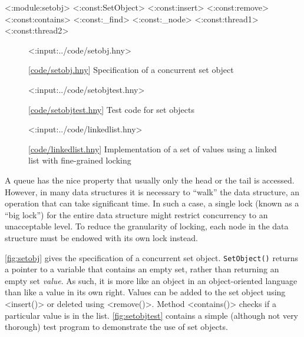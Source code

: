 \documentclass{report}
\newcommand{\harmonylink}[1]{%
[\href{https://harmony.cs.cornell.edu/#1}{\underline{#1}}]%
}
\newenvironment{code}{
\tcolorbox
}{
\endtcolorbox
}
\begin{document}
<{:module:setobj}>
<{:const:SetObject}>
<{:const:insert}>
<{:const:remove}>
<{:const:contains}>
<{:const:_find}>
<{:const:_node}>
<{:const:thread1}>
<{:const:thread2}>

\begin{figure}
\begin{code}
<{:input:../code/setobj.hny}>
\end{code}
\caption{\harmonylink{code/setobj.hny} Specification of a concurrent
set object}
\label{fig:setobj}
\end{figure}

\begin{figure}
\begin{code}
<{:input:../code/setobjtest.hny}>
\end{code}
\caption{\harmonylink{code/setobjtest.hny} Test code for set objects}
\label{fig:setobjtest}
\end{figure}

\begin{figure}
\begin{code}
<{:input:../code/linkedlist.hny}>
\end{code}
\caption{\harmonylink{code/linkedlist.hny} Implementation of a set of values using a linked list with fine-grained locking}
\label{fig:linkedlist}
\end{figure}

%
%
%
%
A queue has the nice property that usually only the head or the tail is accessed.
However, in many data structures it is necessary to ``walk'' the data structure,
an operation that can take significant time.
In such a case, a single lock (known as a ``big lock'')
for the entire data structure might restrict concurrency to an unacceptable level.
To reduce the granularity of locking, each node in the data structure must be
endowed with its own lock instead.

\autoref{fig:setobj} gives the specification of a concurrent set object.
\texttt{SetObject()} returns a pointer to a variable that
contains an empty set, rather than returning an empty set \emph{value}.
As such, it is more like an object in an object-oriented language than
like a value in its own right.
Values can be added to the set object using
<{insert()}> or deleted using <{remove()}>.
Method <{contains()}> checks if a particular value is in the list.
\autoref{fig:setobjtest} contains a simple (although not very thorough)
test program to demonstrate the use of set objects.
\end{document}
